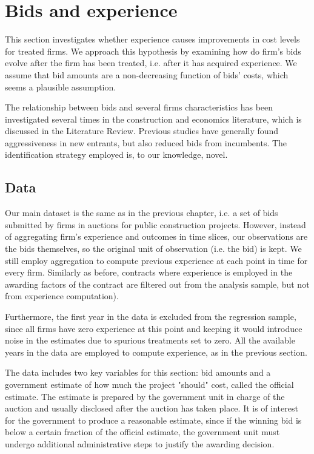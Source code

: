 \section{Bids and experience}
\label{section:bidsexp}
This section investigates whether experience causes improvements in cost levels for treated firms. We approach this hypothesis by examining how do firm's bids evolve after the firm has been treated, i.e. after it has acquired experience. We assume that bid amounts are a non-decreasing function of bids' costs, which seems a plausible assumption.

The relationship between bids and several firms characteristics has been investigated several times in the construction and economics literature, which is discussed in the Literature Review. Previous studies have generally found aggressiveness in new entrants, but also reduced bids from incumbents. The identification strategy employed is, to our knowledge, novel.


\subsection{Data}
Our main dataset is the same as in the previous chapter, i.e. a set of bids submitted by firms in auctions for public construction projects. However, instead of aggregating firm's experience and outcomes in time slices, our observations are the bids themselves, so the original unit of observation (i.e. the bid) is kept. We still employ aggregation to compute previous experience at each point in time for every firm. Similarly as before, contracts where experience is employed in the awarding factors of the contract are filtered out from the analysis sample, but not from experience computation).

Furthermore, the first year in the data is excluded from the regression sample, since all firms have zero experience at this point and keeping it would introduce noise in the estimates due to spurious treatments set to zero. All the available years in the data are employed to compute experience, as in the previous section.

The data includes two key variables for this section: bid amounts and a government estimate of how much the project "should" cost, called the official estimate. The estimate is prepared by the government unit in charge of the auction and usually disclosed after the auction has taken place. It is of interest for the government to produce a reasonable estimate, since if the winning bid is below a certain fraction of the official estimate, the government unit must undergo additional administrative steps to justify the awarding decision.

